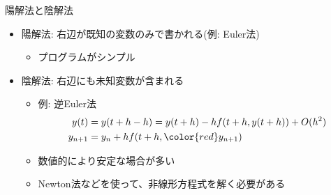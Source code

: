 \begin{frame}[t,fragile]{陽解法と陰解法}
  \begin{itemize}
  \item 陽解法: 右辺が既知の変数のみで書かれる(例: Euler法)
    \begin{itemize}
    \item プログラムがシンプル
    \end{itemize}
  \item 陰解法: 右辺にも未知変数が含まれる
    \begin{itemize}
    \item 例: 逆Euler法
      \begin{align*}
        y(t) &= y(t+h-h) = y(t+h) - h f(t+h,y(t+h)) + O(h^2) \\
        y_{n+1} &= y_n + h f(t+h,{\color{red}y_{n+1}})
      \end{align*}
    \item 数値的により安定な場合が多い
    \item Newton法などを使って、非線形方程式を解く必要がある
    \end{itemize}
  \end{itemize}
\end{frame}
